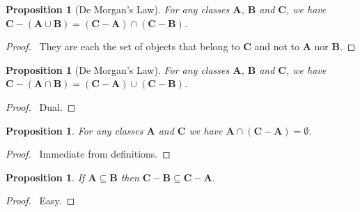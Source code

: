 \documentclass{article}
\let\qed\relax
\newtheorem{proposition}[axiom]{Proposition}
\theoremstyle{definition}
\begin{document}
    \begin{proposition}[De Morgan's Law]
        For any classes $\mathbf{A}$, $\mathbf{B}$ and $\mathbf{C}$, we have
        $\mathbf{C} - (\mathbf{A} \cup \mathbf{B}) = (\mathbf{C} - \mathbf{A}) \cap
        (\mathbf{C} - \mathbf{B})$.
    \end{proposition}

    \begin{proof}
        \pf\ They are each the set of objects that belong to $\mathbf{C}$ and not to $\mathbf{A}$
        nor $\mathbf{B}$. \qed
    \end{proof}

    \begin{proposition}[De Morgan's Law]
        For any classes $\mathbf{A}$, $\mathbf{B}$ and $\mathbf{C}$, we have
        $\mathbf{C} - (\mathbf{A} \cap \mathbf{B}) = (\mathbf{C} - \mathbf{A}) \cup
        (\mathbf{C} - \mathbf{B})$.
    \end{proposition}

    \begin{proof}
        \pf\ Dual. \qed
    \end{proof}

    \begin{proposition}
        For any classes $\mathbf{A}$ and $\mathbf{C}$ we have $\mathbf{A} \cap (\mathbf{C} - \mathbf{A})
        = \emptyset$.
    \end{proposition}

    \begin{proof}
        \pf\ Immediate from definitions. \qed
    \end{proof}

    \begin{proposition}
        If $\mathbf{A} \subseteq \mathbf{B}$ then $\mathbf{C} - \mathbf{B} \subseteq \mathbf{C} - \mathbf{A}$.
    \end{proposition}

    \begin{proof}
        \pf\ Easy. \qed
    \end{proof}
\end{document}
